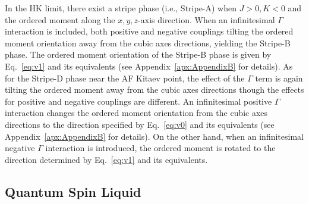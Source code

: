 \documentclass[aps,prb,reprint,amsfonts,amsmath,amssymb,showpacs,groupedaddress,superscriptaddress]{revtex4-1}
\begin{document}
In the HK limit, there exist a stripe phase (i.e., Stripe-A) when $J>0, K<0$ and the ordered moment along the $x,y,z$-axis direction. When an infinitesimal $\Gamma$ interaction is included, both positive and negative couplings tilting the ordered moment orientation away from the cubic axes directions, yielding the Stripe-B phase. The ordered moment orientation of the Stripe-B phase is given by Eq.~\eqref{eq:v1} and its equivalents (see Appendix~\ref{apx:AppendixB} for details). As for the Stripe-D phase near the AF Kitaev point, the effect of the $\Gamma$ term is again tilting the ordered moment away from the cubic axes directions though the effects for positive and negative couplings are different. An infinitesimal positive $\Gamma$ interaction changes the ordered moment orientation from the cubic axes directions to the direction specified by Eq.~\eqref{eq:v0} and its equivalents (see Appendix~\ref{apx:AppendixB} for details). On the other hand, when an infinitesimal negative $\Gamma$ interaction is introduced, the ordered moment is rotated to the direction determined by Eq.~\eqref{eq:v1} and its equivalents.

\subsection{\label{subsec:QSL}Quantum Spin Liquid}
\end{document}

